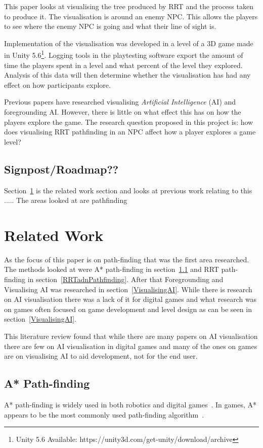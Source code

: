 \documentclass[journal]{IEEEtran}
\begin{document}
	This paper looks at visualising the tree produced by RRT and the process taken to produce it. The visualisation is around an enemy NPC. This allows the players to see where the enemy NPC is going and what their line of sight is. 
	
	Implementation of the visualisation was developed in a level of a 3D game made in Unity 5.6\footnote[1]{Unity 5.6 Available: https://unity3d.com/get-unity/download/archive}. Logging tools in the playtesting software export the amount of time the players spent in a level and what percent of the level they explored. Analysis of this data will then determine whether the visualisation has had any effect on how participants explore.
	
	Previous papers have researched visualising \textit{Artificial Intelligence} (AI) and foregrounding AI. However, there is little on what effect this has on how the players explore the game.
	The research question proposed in this project is: how does visualising RRT pathfinding in an NPC affect how a player explores a game level?
	
	\subsection{Signpost/Roadmap??}
	Section~\ref{RelatedWork} is the related work section and looks at previous work relating to this .....
	The areas looked at are pathfinding 
	
	
	\section{Related Work} \label{RelatedWork}
	As the focus of this paper is on path-finding that was the first area researched. The methods looked at were A* path-finding in section~\ref{A*PF} and RRT path-finding in section~\ref{RRTadnPathfinding}.  After that Foregrounding and Visualising AI was researched in section~\ref{VisualisingAI}. While there is research on AI visualisation there was a lack of it for digital games and what research was on games often focused on game development and level design as can be seen in section~\ref{VisualisingAI}. 
	
	This literature review found that while there are many papers on AI visualisation there are few on AI visualisation in digital games and many of the ones on games are on visualising AI to aid development, not for the end user. 
	
	
	\subsection{A* Path-finding} \label{A*PF}
	A* path-finding is widely used in both robotics and digital games~\cite{Algfoor2015}. In games, A* appears to be the most commonly used path-finding algorithm~\cite{Algfoor2015}.
	
\end{document}
